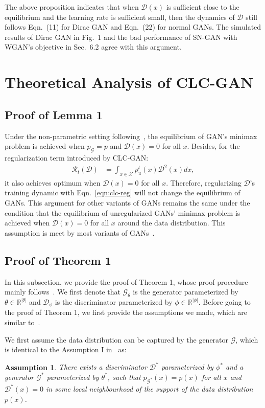 \documentclass{article}
\newcommand{\xG}{\mathcal{G}}
\newcommand{\xD}{\mathcal{D}}
\newcommand{\uR}{\mathcal{R}}
\newcommand{\Real}{\mathbb{R}}
\newcommand{\eqn}[1]{Eqn.~\eqref{eqn:#1}}
\newtheorem{assumption}{Assumption}
\theoremstyle{definition}
\begin{document}
The above proposition indicates that when $\xD(x)$ is sufficient close to the equilibrium and the learning rate is sufficient small, then the dynamics of $\xD$ still follows Eqn.~(11) for Dirac GAN and Eqn.~(22) for normal GANs. The simulated results of Dirac GAN in Fig.~1 and the bad performance of SN-GAN with WGAN's objective in Sec.~6.2 agree with this argument.

\section{Theoretical Analysis of CLC-GAN}

\subsection{Proof of Lemma 1}

Under the non-parametric setting following~\citet{goodfellow2014generative}, the equilibrium of GAN's minimax problem is achieved when $p_\xG=p$ and $\xD(x) = 0$ for all $x$. Besides, for the regularization term introduced by CLC-GAN:
\begin{align}
    \uR_t(\xD) &= \int_{x\in\mathcal{X}} p_u^t(x)\xD^2(x)dx,
    \label{eqn:clc-reg}
\end{align}
it also achieves optimum when $\xD(x) = 0$ for all $x$. Therefore, regularizing $\xD$'s training dynamic with \eqn{clc-reg} will not change the equilibrium of GANs. This argument for other variants of GANs remains the same under the condition that the equilibrium of unregularized GANs' minimax problem is achieved when $\xD(x) = 0$ for all $x$ around the data distribution. This assumption is meet by most variants of GANs~\cite{arjovsky2017wasserstein,mao2017least,miyato2018spectral,zhang2019consistency}.

\subsection{Proof of Theorem 1}

In this subsection, we provide the proof of Theorem 1, whose proof procedure mainly follows~\citet{mescheder2018training}. We first denote that $\xG_\theta$ is the generator parameterized by $\theta\in \Real^{|\theta|}$ and $\xD_{\phi}$ is the discriminator parameterized by $\phi\in \Real^{|\phi|}$.
Before going to the proof of Theorem 1, we first provide the assumptions we made, which are similar to~\cite{mescheder2018training}.

We first assume the data distribution can be captured by the generator $\xG$, which is identical to the Assumption I in~\cite{mescheder2018training} as:
\begin{assumption}
There exists a discriminator $\xD^*$ parameterized by $\phi^*$ and a generator $\xG^*$ parameterized by $\theta^*$, such that $p_{\xG^*}(x) = p(x)$ for all $x$ and $\xD^*(x) = 0$ in some local neighbourhood of the support of the data distribution $p(x)$.
\label{ass1}
\end{assumption}
\end{document}
